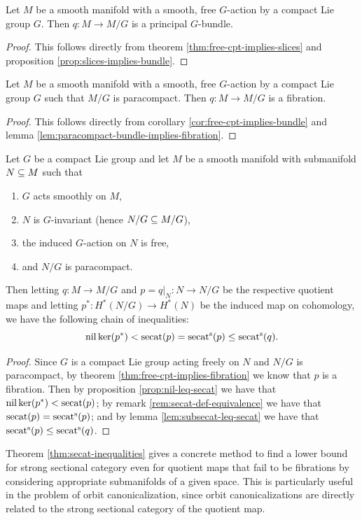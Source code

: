 \begin{corollary}\label{cor:free-cpt-implies-bundle}
    Let $M$ be a smooth manifold with a smooth, free $G$-action by a compact Lie group $G$.
    Then $q : M \to M/G$ is a principal $G$-bundle.
    \begin{proof}
        This follows directly from theorem \ref{thm:free-cpt-implies-slices} and proposition \ref{prop:slices-implies-bundle}.
    \end{proof}
\end{corollary}

\begin{theorem}\label{thm:free-cpt-implies-fibration}
    Let $M$ be a smooth manifold with a smooth, free $G$-action by a compact Lie group $G$ such that $M/G$ is paracompact.
    Then $q : M \to M/G$ is a fibration.
    \begin{proof}
        This follows directly from corollary \ref{cor:free-cpt-implies-bundle} and lemma \ref{lem:paracompact-bundle-implies-fibration}.
    \end{proof}
\end{theorem}

\begin{theorem}\label{thm:secat-inequalities}
    Let $G$ be a compact Lie group and let $M$ be a smooth manifold with submanifold $N \subseteq M$ such that
    \begin{enumerate}
        \item $G$ acts smoothly on $M$,
        \item $N$ is $G$-invariant (hence $N/G \subseteq M/G$),
        \item the induced $G$-action on $N$ is free,
        \item and $N/G$ is paracompact.
    \end{enumerate}
    Then letting $q : M \to M/G$ and $p = q|_N : N \to N/G$ be the respective quotient maps and letting $p^* : H^*(N/G) \to H^*(N)$ be the induced map on cohomology, we have the following chain of inequalities:
    \[
        \operatorname{nil} \ker (p^*)
        < \operatorname{secat}(p)
        = \operatorname{secat^s}(p)
        \leq \operatorname{secat^s}(q).
    \]
    \begin{proof}
        Since $G$ is a compact Lie group acting freely on $N$ and $N/G$ is paracompact, by theorem \ref{thm:free-cpt-implies-fibration} we know that $p$ is a fibration.
        Then by proposition \ref{prop:nil-leq-secat} we have that $\operatorname{nil} \ker (p^*) < \operatorname{secat}(p)$; by remark \ref{rem:secat-def-equivalence} we have that $\operatorname{secat}(p) = \operatorname{secat^s}(p)$; and by lemma \ref{lem:subsecat-leq-secat} we have that $\operatorname{secat^s}(p) \leq \operatorname{secat^s}(q)$.
    \end{proof}
\end{theorem}

Theorem \ref{thm:secat-inequalities} gives a concrete method to find a lower bound for strong sectional category even for quotient maps that fail to be fibrations by considering appropriate submanifolds of a given space.
This is particularly useful in the problem of orbit canonicalization, since orbit canonicalizations are directly related to the strong sectional category of the quotient map.
